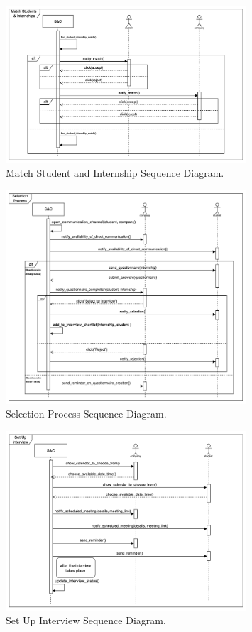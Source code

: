\begin{figure}[H]
\centering
\includegraphics[width=0.8\textwidth]{Images/Match_Sequence_Diagram.png}
\caption{\label{fig:metamodel9}Match Student and Internship Sequence Diagram.}
\end{figure}

\begin{figure}[H]
\centering
\includegraphics[width=0.8\textwidth]{Images/Selection_Process_Sequence_Diagram.png}
\caption{\label{fig:metamodel9}Selection Process Sequence Diagram.}
\end{figure}

\begin{figure}[H]
\centering
\includegraphics[width=0.8\textwidth]{Images/set_Up_Interview_Sequence_Diagram.png}
\caption{\label{fig:metamodel9}Set Up Interview Sequence Diagram.}
\end{figure}

